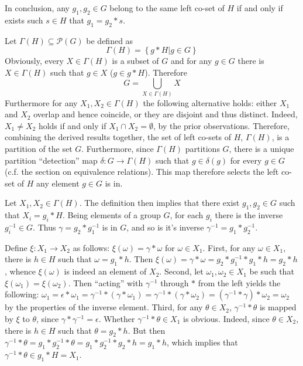 \documentclass[a4paper]{article}
\newcommand{\obj}[1]{\left\{{#1}\right\}}
\newcommand{\brac}[1]{{\left({#1}\right)}}
\begin{document}
In conclusion, any $g_1,g_2\in G$ belong to the same left co-set of $H$ if and only if exists such $s\in H$ that $g_1=g_2\ast s$.

Let $\Gamma(H)\subseteq \mathcal{P}\brac{G}$ be defined as \[\Gamma(H) = \obj{ g\ast H\vert g\in G}\] Obviously, every $X\in \Gamma(H)$ is a subset of $G$ and for any $g\in G$ there is $X\in \Gamma(H)$ such that $g\in X$ ($g\in g\ast H$). Therefore \[G = \bigcup_{X\in \Gamma(H)} X\] Furthermore for any $X_1, X_2\in \Gamma(H)$ the following alternative holds: either $X_1$ and $X_2$ overlap and hence coincide, or they are disjoint and thus distinct. Indeed, $X_1\neq X_2$ holds if and only if $X_1\cap X_2=\emptyset$, by the prior observations. Therefore, combining the derived results together, the set of left co-sets of $H$, $\Gamma(H)$, is a partition of the set $G$. Furthermore, since $\Gamma(H)$ partitions $G$, there is a unique partition ``detection'' map $\delta:G\to \Gamma(H)$ such that $g\in \delta(g)$ for every $g\in G$ (c.f. the section on equivalence relations). This map therefore selects the left co-set of $H$ any element $g\in G$ is in.

Let $X_1, X_2\in \Gamma(H)$. The definition then implies that there exist $g_1, g_2\in G$ such that $X_i=g_i\ast H$. Being elements of a group $G$, for each $g_i$ there is the inverse $g_i^{-1}\in G$. Thus $\gamma=g_2\ast g_1^{-1}$ is in $G$, and so is it's inverse $\gamma^{-1} = g_1\ast g_2^{-1}$.

Define $\xi:X_1\to X_2$ as follows: $\xi(\omega) = \gamma\ast \omega$ for $\omega\in X_1$.
First, for any $\omega\in X_1$, there is $h\in H$ such that $\omega = g_1\ast h$. Then $\xi(\omega)=\gamma\ast \omega = g_2\ast g_1^{-1}\ast g_1\ast h = g_2\ast h$, whence $\xi(\omega)$ is indeed an element of $X_2$.
Second, let $\omega_1, \omega_2\in X_1$ be such that $\xi(\omega_1)=\xi(\omega_2)$. Then ``acting'' with $\gamma^{-1}$ through $\ast$ from the left yields the following: $\omega_1 = \epsilon\ast \omega_1 = \gamma^{-1}\ast \brac{\gamma\ast \omega_1} = \gamma^{-1}\ast \brac{\gamma\ast \omega_2} = \brac{\gamma^{-1}\ast \gamma}\ast \omega_2 = \omega_2$ by the properties of the inverse element. 
Third, for any $\theta\in X_2$, $\gamma^{-1}\ast \theta$ is mapped by $\xi$ to $\theta$, since $\gamma\ast \gamma^{-1} = \epsilon$. Whether $\gamma^{-1}\ast \theta\in X_1$ is obvious. Indeed, since $\theta\in X_2$, there is $h\in H$ such that $\theta=g_2\ast h$. But then $\gamma^{-1}\ast \theta = g_1\ast g_2^{-1}\ast \theta = g_1\ast g_2^{-1}\ast g_2\ast h = g_1\ast h$, which implies that $\gamma^{-1}\ast \theta\in g_1\ast H=X_1$.
\end{document}
